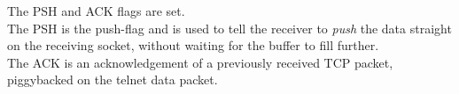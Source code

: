 The PSH and ACK flags are set.\\
The PSH is the push-flag and is used to tell the receiver to \textit{push} the data straight on the receiving socket, without waiting for the buffer to fill further.\\
The ACK is an acknowledgement of a previously received TCP packet, piggybacked on the telnet data packet. \\
